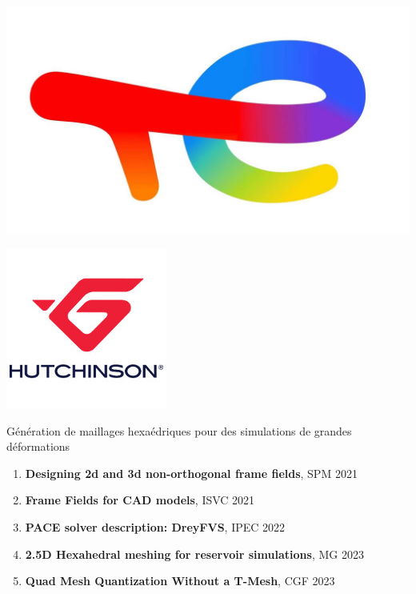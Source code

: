 \documentclass{beamer}
\begin{document}
{\begin{center}
\begin{minipage}{.193\textwidth}
    \end{minipage}%
    \begin{minipage}{.193\textwidth}
        \centering
    \includegraphics[width=.6\linewidth]{img/new_images/total_energies.jpg}
    \end{minipage}
    \begin{minipage}{.193\textwidth}
        \includegraphics[width=.6\linewidth]{img/new_images/hutchinson.png}
    \end{minipage}
\end{center}
}

\frame{\titlepage}
\fi
\begin{frame}{Génération de maillages hexaédriques pour des simulations de grandes déformations}
    \centering
    \small
    \begin{enumerate}
        \item \textbf{Designing 2d and 3d non-orthogonal frame fields}, SPM 2021
        \item \textbf{Frame Fields for CAD models}, ISVC 2021
        \item \textbf{PACE solver description: DreyFVS}, IPEC 2022
        \item \textbf{2.5D Hexahedral meshing for reservoir simulations}, MG 2023
        \item \textbf{Quad Mesh Quantization Without a T-Mesh}, CGF 2023
    \end{enumerate}
\end{frame}
\end{document}
